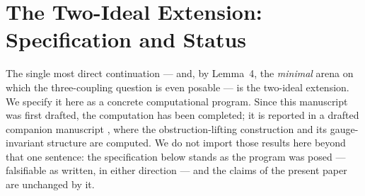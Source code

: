 \documentclass[11pt]{article}
\begin{document}
\section{The Two-Ideal Extension: Specification and Status}

The single most direct continuation --- and, by Lemma~4, the \emph{minimal} arena on which the three-coupling question is even posable --- is the two-ideal extension. We specify it here as a concrete computational program. Since this manuscript was first drafted, the computation has been completed; it is reported in a drafted companion manuscript \cite{twoideal}, where the obstruction-lifting construction and its gauge-invariant structure are computed. We do not import those results here beyond that one sentence: the specification below stands as the program was posed --- falsifiable as written, in either direction --- and the claims of the present paper are unchanged by it.
\end{document}
